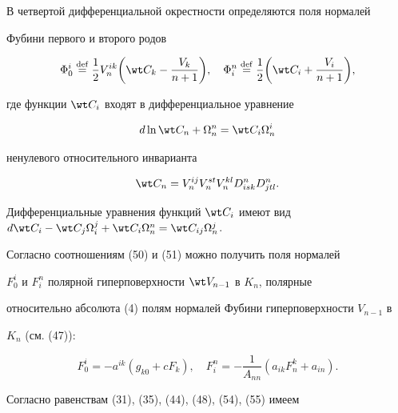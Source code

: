  


В четвертой дифференциальной окрестности определяются поля нормалей 


Фубини первого и второго родов 


\begin{equation} 


\Phi^i_0\eqdef\frac{1}{2}V^{ik}_n\bigg(\wt C_k-\frac{V_k}{n+1}\bigg), 


\quad \Phi^n_i\eqdef\frac{1}{2}\bigg(\wt C_i+\frac{V_i}{n+1}\bigg), 


\end{equation} 


где функции $\wt C_i$ входят в дифференциальное уравнение 


\begin{equation} 


d\ln\wt C_n+\Omega^n_n=\wt C_i\Omega^i_n 


\end{equation} 


ненулевого относительного инварианта 


\begin{equation} 


\wt C_n=V^{ij}_n V^{st}_n V^{kl}_n D^n_{isk}D^n_{jtl}. 


\end{equation} 


Дифференциальные уравнения функций $\wt C_i$ имеют вид $d\wt C_i-\wt C_j 


\Omega^j_i+\wt C_i\Omega^n_n=\wt C_{ij}\Omega^j_n$. 


 


Согласно соотношениям (50) и (51) можно получить поля нормалей 


$F^i_0$ и $F^n_i$ полярной гиперповерхности $\wt V_{n-1}$ в $K_n$, полярные 


относительно абсолюта (4) полям нормалей Фубини гиперповерхности $V_{n-1}$ в 


$K_n$ (см. (47)): 


\begin{equation} 


F^i_0=-a^{ik}(g_{k0}+c F_k),\quad F^n_i=-\frac{1}{A_{nn}} 


(a_{ik}F^k_n+a_{in}). 


\end{equation} 


 


Согласно равенствам (31), (35), (44), (48), (54), (55) имеем 


